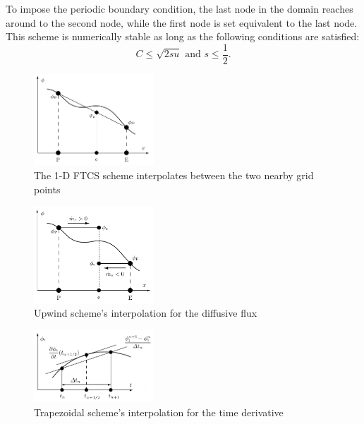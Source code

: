 \documentclass[twocolumn,10pt]{asme2ej}
\begin{document}
\noindent To impose the periodic boundary condition, the last node in the domain reaches around to the second node, while the first node is set equivalent to the last node. This scheme is numerically stable as long as the following conditions are satisfied:
\begin{equation}
\label{FTCS_stability}
C \leq \sqrt{2su} \mbox{ and } s \leq \frac{1}{2}.
\end{equation}

\begin{figure}[t]
\begin{center}
\includegraphics[width=0.4\textwidth]{figure/FTCS.png}
\caption{The 1-D FTCS scheme interpolates between the two nearby grid points~\cite{analytic_citation}}
\label{FTCS_scheme}
\end{center}
\end{figure}

\begin{figure}[t]
\begin{center}
\includegraphics[width=0.4\textwidth]{figure/Upwind.png}
\caption{Upwind scheme's interpolation for the diffusive flux~\cite{analytic_citation}}
\label{Upwind_scheme}
\end{center}
\end{figure}

\begin{figure}[t]
\begin{center}
\includegraphics[width=0.4\textwidth]{figure/Trapezoidal (time derivative).png}
\caption{Trapezoidal scheme's interpolation for the time derivative~\cite{analytic_citation}}
\label{Trapezoidal_scheme}
\end{center}
\end{figure}
\end{document}
